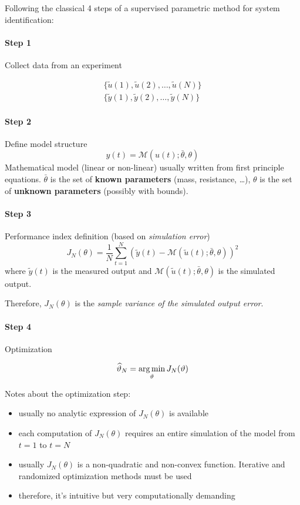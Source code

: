 Following the classical 4 steps of a supervised parametric method for system identification:

\paragraph{Step 1} Collect data from an experiment

\begin{align*}
    \{ \tilde{u}(1), \tilde{u}(2), \dots, \tilde{u}(N) \} \\
    \{ \tilde{y}(1), \tilde{y}(2), \dots, \tilde{y}(N) \}
\end{align*}

\paragraph{Step 2} Define model structure
\[
    y(t) = \mathcal{M}(u(t); \bar{\theta}, \theta)
\]
Mathematical model (linear or non-linear) usually written from first principle equations. $\bar{\theta}$ is the set of \textbf{known parameters} (mass, resistance, \dots), $\theta$ is the set of \textbf{unknown parameters} (possibly with bounds).

\paragraph{Step 3} Performance index definition (based on \emph{simulation error})
\[
    J_N(\theta) = \frac{1}{N} \sum_{t=1}^N \left( \tilde{y}(t) - \mathcal{M}(\tilde{u}(t); \bar{\theta}, \theta) \right)^2
\]
where $\tilde{y}(t)$ is the measured output and $\mathcal{M}(\tilde{u}(t); \bar{\theta}, \theta)$ is the simulated output.

Therefore, $J_N(\theta)$ is the \emph{sample variance of the simulated output error}.

\paragraph{Step 4} Optimization

\[
    \widehat{\vartheta}_N = \operatorname*{arg\,min}_\vartheta J_N(\vartheta)
\]

Notes about the optimization step:
\begin{itemize}
    \item usually no analytic expression of $J_N(\theta)$ is available
    \item each computation of $J_N(\theta)$ requires an entire simulation of the model from $t=1$ to $t=N$
    \item usually $J_N(\theta)$ is a non-quadratic and non-convex function. Iterative and randomized optimization methods must be used
    \item therefore, it's intuitive but very computationally demanding
\end{itemize}

